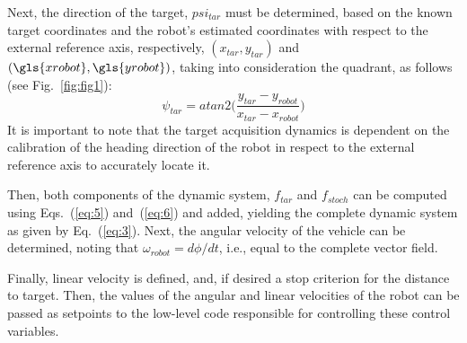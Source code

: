 Next, the direction of the target, $psi_{tar}$ must be determined, based on the
known target coordinates and the robot's estimated coordinates with respect to
the external reference axis, respectively, $(x_{tar},y_{tar})$ and $(\gls{xrobot},
\gls{yrobot})$, taking into consideration the quadrant, as follows (see Fig.~\ref{fig:fig1}):
\begin{equation}
  \label{eq:11}
 \psi_{tar} = atan2 \Big(\frac{y_{tar} - y_{robot}}{x_{tar} - x_{robot}}\Big)
\end{equation}
It is important to note that the target acquisition dynamics is dependent
on the calibration of the heading direction of the robot in respect to the
external reference axis to accurately locate it.

Then, both components of the dynamic system, $f_{tar}$ and $f_{stoch}$ can be
computed using Eqs.~(\ref{eq:5}) and~(\ref{eq:6}) and added, yielding the
complete dynamic system as given by Eq.~(\ref{eq:3}). Next, the angular velocity
of the vehicle can be determined, noting that $\omega _{robot} = d \phi /dt$,
i.e., equal to the complete vector field.

Finally, linear velocity is defined, and, if desired a stop criterion for the
distance to target. Then, the values of the angular and linear velocities of the
robot can be passed as setpoints to the low-level code responsible for
controlling these control variables.

